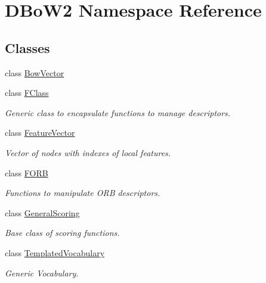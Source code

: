 \hypertarget{namespace_d_bo_w2}{}\section{D\+Bo\+W2 Namespace Reference}
\label{namespace_d_bo_w2}
\subsection*{Classes}
\begin{DoxyCompactItemize}
\item 
class \mbox{\hyperlink{class_d_bo_w2_1_1_bow_vector}{Bow\+Vector}}
\item 
class \mbox{\hyperlink{class_d_bo_w2_1_1_f_class}{F\+Class}}
\begin{DoxyCompactList}\small\item\em Generic class to encapsulate functions to manage descriptors. \end{DoxyCompactList}\item 
class \mbox{\hyperlink{class_d_bo_w2_1_1_feature_vector}{Feature\+Vector}}
\begin{DoxyCompactList}\small\item\em Vector of nodes with indexes of local features. \end{DoxyCompactList}\item 
class \mbox{\hyperlink{class_d_bo_w2_1_1_f_o_r_b}{F\+O\+RB}}
\begin{DoxyCompactList}\small\item\em Functions to manipulate O\+RB descriptors. \end{DoxyCompactList}\item 
class \mbox{\hyperlink{class_d_bo_w2_1_1_general_scoring}{General\+Scoring}}
\begin{DoxyCompactList}\small\item\em Base class of scoring functions. \end{DoxyCompactList}\item 
class \mbox{\hyperlink{class_d_bo_w2_1_1_templated_vocabulary}{Templated\+Vocabulary}}
\begin{DoxyCompactList}\small\item\em Generic Vocabulary. \end{DoxyCompactList}\end{DoxyCompactItemize}

